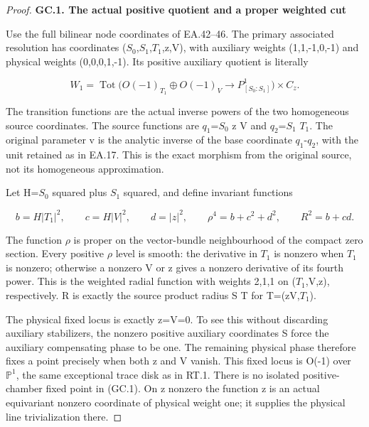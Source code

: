 \begin{proof}
\par

\medskip\noindent\textbf{GC.1. The actual positive quotient and a proper weighted cut}

\par\nobreak

Use the full bilinear node coordinates of EA.42--46. The primary
associated resolution has coordinates (\(S_0\),\(S_1\),\(T_1\),z,V), with auxiliary
weights (1,1,-1,0,-1) and physical weights (0,0,0,1,-1). Its positive
auxiliary quotient is literally

\[
 W_1=\operatorname{Tot}\bigl(O(-1)_{T_1}\oplus O(-1)_V
                  \longrightarrow P^1_{[S_0:S_1]}\bigr)\times C_z.
 \tag{GC.1}
\]

The transition functions are the actual inverse powers of the two
homogeneous source coordinates. The source functions are
\(q_1\)=\(S_0\) z V and \(q_2\)=\(S_1\) \(T_1\). The original parameter v is the analytic
inverse of the base coordinate \(q_1\)-\(q_2\), with the unit retained as in
EA.17. This is the exact morphism from the original source, not
its homogeneous approximation.

Let H=\textbar{}\(S_0\)\textbar{} squared plus \textbar{}\(S_1\)\textbar{} squared, and define invariant functions

\[
 b=H|T_1|^2,\qquad c=H|V|^2,\qquad d=|z|^2,
 \qquad \rho^4=b+c^2+d^2,\qquad R^2=b+cd.          \tag{GC.2}
\]

The function \(\rho\) is proper on the vector-bundle neighbourhood of
the compact zero section. Every positive \(\rho\) level is smooth:
the derivative in \(T_1\) is nonzero when \(T_1\) is nonzero; otherwise a
nonzero V or z gives a nonzero derivative of its fourth power.
This is the weighted radial function with weights 2,1,1 on
(\(T_1\),V,z), respectively. R is exactly the source product radius
\textbar\textbar S\textbar\textbar{} \textbar\textbar T\textbar\textbar{} for T=(zV,\(T_1\)).

The physical fixed locus is exactly z=V=0. To see this without
discarding auxiliary stabilizers, the nonzero positive auxiliary
coordinates S force the auxiliary compensating phase to be one.
The remaining physical phase therefore fixes a point precisely
when both z and V vanish. This fixed locus is O(-1) over \(\mathbb P^1\), the
same exceptional trace disk as in RT.1. There is no isolated
positive-chamber fixed point in (GC.1). On z nonzero the function
z is an actual equivariant nonzero coordinate of physical weight
one; it supplies the physical line trivialization there.


\end{proof}
